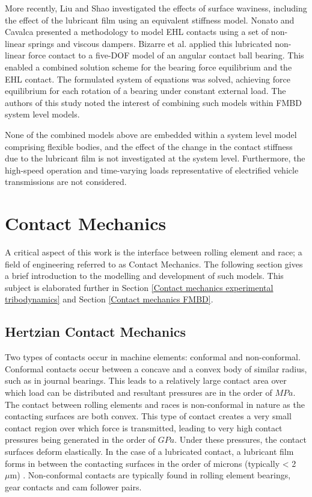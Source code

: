 More recently, Liu and Shao \cite{Liu2017b} investigated the effects of surface waviness, including the effect of the lubricant film using an equivalent stiffness model. Nonato and Cavalca \cite{Nonato2014} presented a methodology to model EHL contacts using a set of non-linear springs and viscous dampers. Bizarre et al. \cite{Bizarre2018} applied this lubricated non-linear force contact to a five-DOF model of an angular contact ball bearing. This enabled a combined solution scheme for the bearing force equilibrium and the EHL contact. The formulated system of equations was solved, achieving force equilibrium for each rotation of a bearing under constant external load. The authors of this study noted the interest of combining such models within FMBD system level models.

None of the combined models above are embedded within a system level model comprising flexible bodies, and the effect of the change in the contact stiffness due to the lubricant film is not investigated at the system level. Furthermore, the high-speed operation and time-varying loads representative of electrified vehicle transmissions are not considered.

\section{Contact Mechanics}
A critical aspect of this work is the interface between rolling element and race; a field of engineering referred to as Contact Mechanics. The following section gives a brief introduction to the modelling and development of such models. This subject is elaborated further in Section \ref{Contact mechanics experimental tribodynamics} and Section \ref{Contact mechanics FMBD}.

\subsection{Hertzian Contact Mechanics}

Two types of contacts occur in machine elements: conformal and non-conformal. Conformal contacts occur between a concave and a convex body of similar radius, such as in journal bearings. This leads to a relatively large contact area over which load can be distributed and resultant pressures are in the order of $MPa$. The contact between rolling elements and races is non-conformal in nature as the contacting surfaces are both convex. This type of contact creates a very small contact region over which force is transmitted, leading to very high contact pressures being generated in the order of $GPa$. Under these pressures, the contact surfaces deform elastically. In the case of a lubricated contact, a lubricant film forms in between the contacting surfaces in the order of microns (typically < 2~$\mu \mathrm{m}$) \cite{Gohar2018}. Non-conformal contacts are typically found in rolling element bearings, gear contacts and cam follower pairs.

